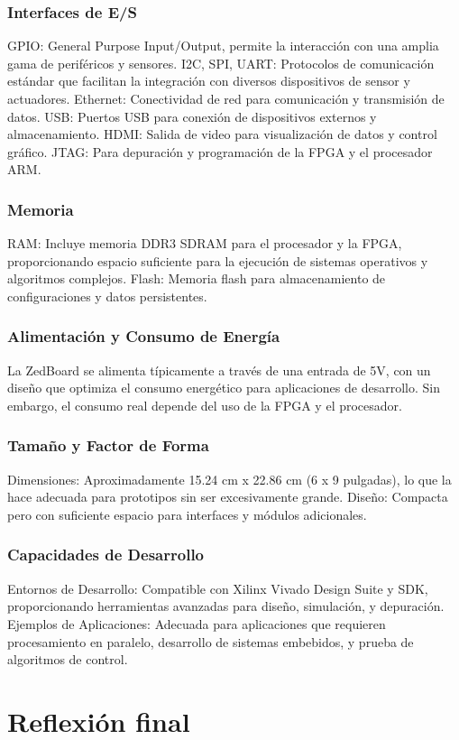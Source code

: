 \subsubsection{Interfaces de E/S}
GPIO: General Purpose Input/Output, permite la interacción con una amplia gama de periféricos y sensores.
I2C, SPI, UART: Protocolos de comunicación estándar que facilitan la integración con diversos dispositivos de sensor y actuadores.
Ethernet: Conectividad de red para comunicación y transmisión de datos.
USB: Puertos USB para conexión de dispositivos externos y almacenamiento.
HDMI: Salida de video para visualización de datos y control gráfico.
JTAG: Para depuración y programación de la FPGA y el procesador ARM.
\subsubsection{Memoria}
RAM: Incluye memoria DDR3 SDRAM para el procesador y la FPGA, proporcionando espacio suficiente para la ejecución de sistemas operativos y algoritmos complejos.
Flash: Memoria flash para almacenamiento de configuraciones y datos persistentes.
\subsubsection{Alimentación y Consumo de Energía}
La ZedBoard se alimenta típicamente a través de una entrada de 5V, con un diseño que optimiza el consumo energético para aplicaciones de desarrollo. Sin embargo, el consumo real depende del uso de la FPGA y el procesador.
\subsubsection{Tamaño y Factor de Forma}
Dimensiones: Aproximadamente 15.24 cm x 22.86 cm (6 x 9 pulgadas), lo que la hace adecuada para prototipos sin ser excesivamente grande.
Diseño: Compacta pero con suficiente espacio para interfaces y módulos adicionales.
\subsubsection{Capacidades de Desarrollo}
Entornos de Desarrollo: Compatible con Xilinx Vivado Design Suite y SDK, proporcionando herramientas avanzadas para diseño, simulación, y depuración.
Ejemplos de Aplicaciones: Adecuada para aplicaciones que requieren procesamiento en paralelo, desarrollo de sistemas embebidos, y prueba de algoritmos de control.

\section{Reflexión final}

